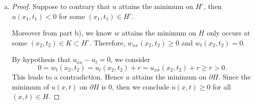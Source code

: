 \begin{Exercise}
\begin{enumerate}[a)]
\begin{proof}
Hence, we conclude the minimum of $w(x,t)$ on $H$ occurs at some $(x_2,t_2)\in K$ as promised.
\end{proof}

\item 
\begin{proof}
Suppose to contrary that $u$ attains the minimum on $H^{\circ}$, then $u(x_1,t_1)<0$ for some $(x_1,t_1)\in H^{\circ}$.

Moreover from part b), we know $w$ attains the minimum on $H$ only occurs at some $(x_2,t_2)\in K \subset H^{\circ}$. Therefore, $w_{x x}(x_2,t_2)\geq 0$ and $w_{t}(x_2,t_2) = 0$.

By hypothesis that $u_{x x} - u_{t} = 0$, we consider
$$
0 = w_{t}(x_2,t_2) = u_{t}(x_2,t_2)+r = u_{x x}(x_2,t_2)+r \geq r > 0.
$$
This leads to a contradiction. Hence $u$ attains the minimum on $\partial H$. Since the minimum of $u(x,t)$ on $\partial H$ is $0$, then we conclude $u(x,t)\geq 0$ for all $(x,t)\in H$.
\end{proof}
\end{enumerate}
\end{Exercise}